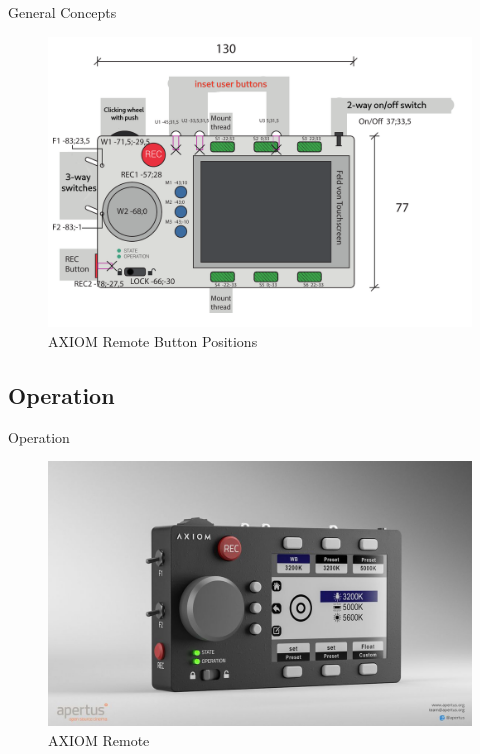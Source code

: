 \documentclass{beamer}
\begin{document}
\begin{frame}{General Concepts}
	\begin{center}
		\begin{figure}[h]
		    \centering
		    \includegraphics[width=0.8\linewidth]{images/axiom_remote_bottonPos.png}
		    \caption{AXIOM Remote Button Positions}
		    \label{fig:logo}
		\end{figure}
	\end{center}
\end{frame}

\subsection{Operation}

\begin{frame}{Operation}
	\begin{center}
		\begin{figure}[h]
		    \centering
		    \includegraphics[width=0.8\linewidth]{images/Axiom_Remote_V3.jpg}
		    \caption{AXIOM Remote}
		    \label{fig:logo}
		\end{figure}
	\end{center}
\end{frame}
\end{document}
